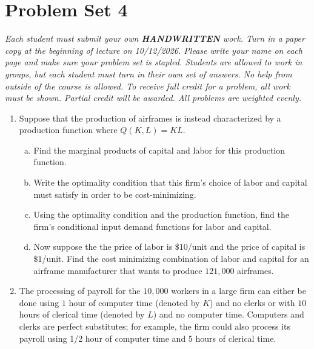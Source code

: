 \documentclass[11pt]{article}
\begin{document}
  
\section*{Problem Set 4}

\emph{Each student must submit your own \textbf{HANDWRITTEN} work. Turn in a paper copy at the beginning of lecture on 10/12/2026.  Please write your name on each page and make sure your problem set is stapled.  Students are allowed to work in groups, but each student must turn in their own set of answers.  No help from outside of the course is allowed.  To receive full credit for a problem, all work must be shown.  Partial credit will be awarded.  All problems are weighted evenly.}


\begin{enumerate}
  \item Suppose that the production of airframes is instead characterized by a production function where $Q(K, L) = KL$.
  
  \begin{enumerate}[(a)]
    \item Find the marginal products of capital and labor for this production function.
    

    \vspace*{40mm}
    \item Write the optimality condition that this firm’s choice of labor and capital must satisfy in order to be cost-minimizing.
    
    \vspace*{40mm}
    \item Using the optimality condition and the production function, find the firm’s conditional input demand functions for labor and capital.
    

    \newpage
    \item Now suppose the the price of labor is $\$10$/unit and the price of capital is $\$1$/unit. Find the cost minimizing combination of labor and capital for an airframe manufacturer that wants to produce $121,000$ airframes.
  \end{enumerate}
  \newpage
  \item The processing of payroll for the $10,000$ workers in a large firm can either be done using $1$ hour of computer time (denoted by $K$) and no clerks or with $10$ hours of clerical time (denoted by $L$) and no computer time. Computers and clerks are perfect substitutes; for example, the firm could also process its payroll using 1/2 hour of computer time and 5 hours of clerical time.
  

\end{enumerate}
\end{document}
